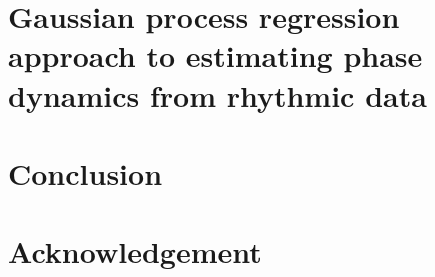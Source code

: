 \documentclass[dvipdfmx,12pt,twoside,openright]{book}
\begin{document}
\chapter{Gaussian process regression approach to estimating phase dynamics from rhythmic data}
\label{chap:paper06}

\begin{subappendices}
  
\end{subappendices}
\printbibliography[segment=\therefsegment,heading=subbibliography]
% 
% 

\chapter{Conclusion}
\label{chap:conclusion}

\printbibliography[segment=\therefsegment,heading=subbibliography]
% 
% 

\newpage

\appendix

% 

\chapter*{Acknowledgement}



% 
% 
\end{document}
